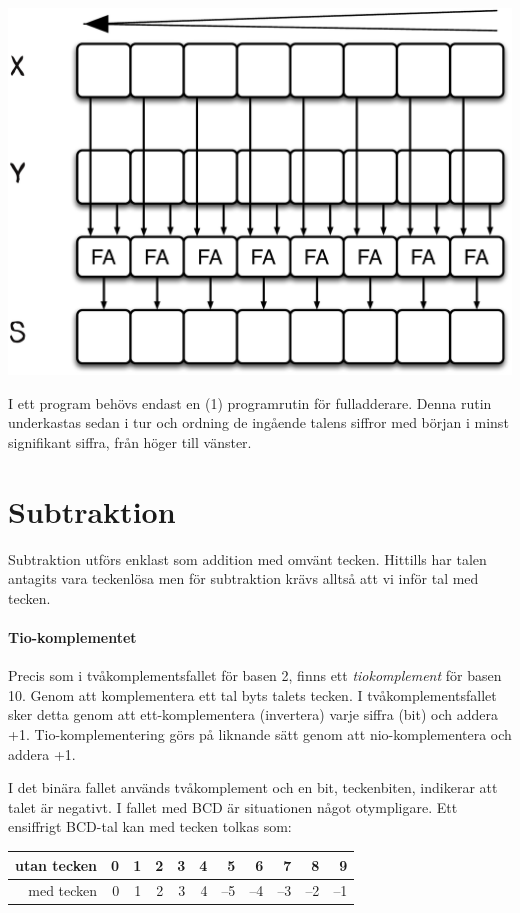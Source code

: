 \documentclass[oneside,10pt,a4paper,swedish]{scrbook}
\begin{document}
\begin{center}
\includegraphics[scale = 0.4]{fakedja.pdf}
\end{center}

I ett program behövs endast en (1) programrutin för fulladderare. Denna rutin underkastas sedan i tur och ordning de ingående talens siffror med början i minst signifikant siffra, från höger till vänster.


\section{Subtraktion} Subtraktion utförs enklast som addition med omvänt tecken. Hittills har talen antagits vara teckenlösa men för subtraktion krävs alltså att vi inför tal med tecken. 

\paragraph{Tio-komplementet} Precis som i tvåkomplementsfallet för basen 2, finns ett \emph{tiokomplement} för basen 10. Genom att komplementera ett tal byts talets tecken. I tvåkomplementsfallet sker detta genom att ett-komplementera (invertera) varje siffra (bit) och addera +1. Tio-komplementering görs på liknande sätt genom att nio-komplementera och addera +1.

I det binära fallet används tvåkomplement och en bit, teckenbiten, indikerar att talet är negativt. I fallet med BCD är situationen något otympligare. Ett ensiffrigt BCD-tal kan med tecken tolkas som:


\begin{center}
\begin{tabular}{r|rrrrrrrrrr|}
 utan tecken    & 0 & 1 & 2 & 3 & 4 & 5 & 6 & 7 & 8 & 9 \\
 \hline
med tecken      & 0 & 1 & 2 & 3 & 4 & --5 & --4 & --3 & --2 & --1 \\
 \end{tabular}
\end{center}
\end{document}

